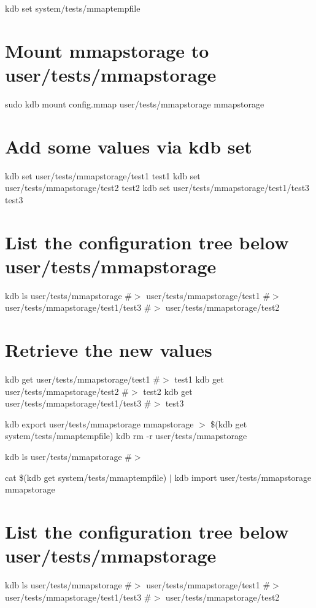 kdb set system/tests/mmaptempfile 

\section*{Mount mmapstorage to {\ttfamily user/tests/mmapstorage}}

sudo kdb mount config.\+mmap user/tests/mmapstorage mmapstorage

\section*{Add some values via {\ttfamily kdb set}}

kdb set user/tests/mmapstorage/test1 test1 kdb set user/tests/mmapstorage/test2 test2 kdb set user/tests/mmapstorage/test1/test3 test3

\section*{List the configuration tree below {\ttfamily user/tests/mmapstorage}}

kdb ls user/tests/mmapstorage \#$>$ user/tests/mmapstorage/test1 \#$>$ user/tests/mmapstorage/test1/test3 \#$>$ user/tests/mmapstorage/test2

\section*{Retrieve the new values}

kdb get user/tests/mmapstorage/test1 \#$>$ test1 kdb get user/tests/mmapstorage/test2 \#$>$ test2 kdb get user/tests/mmapstorage/test1/test3 \#$>$ test3

kdb export user/tests/mmapstorage mmapstorage $>$ \$(kdb get system/tests/mmaptempfile) kdb rm -\/r user/tests/mmapstorage

kdb ls user/tests/mmapstorage \#$>$

cat \$(kdb get system/tests/mmaptempfile) $\vert$ kdb import user/tests/mmapstorage mmapstorage

\section*{List the configuration tree below {\ttfamily user/tests/mmapstorage}}

kdb ls user/tests/mmapstorage \#$>$ user/tests/mmapstorage/test1 \#$>$ user/tests/mmapstorage/test1/test3 \#$>$ user/tests/mmapstorage/test2

